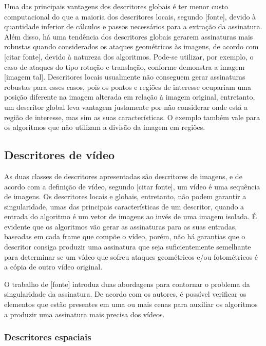 Uma das principais vantagens dos descritores globais é ter menor custo computacional do que a maioria dos descritores locais, segundo [fonte], devido à quantidade inferior de cálculos e passos necessários para a extração da assinatura. Além disso, há uma tendência dos descritores globais gerarem assinaturas mais robustas quando considerados os ataques geométricos às imagens, de acordo com [citar fonte], devido à natureza dos algoritmos. Pode-se utilizar, por exemplo, o caso de ataques do tipo rotação e translação, conforme demonstra a imagem [imagem tal]. Descritores locais usualmente não conseguem gerar assinaturas robustas para esses casos, pois os pontos e regiões de interesse ocupariam uma posição diferente na imagem alterada em relação à imagem original, entretanto, um descritor global leva vantagem justamente por não considerar onde está a região de interesse, mas sim as suas características. O exemplo também vale para os algoritmos que não utilizam a divisão da imagem em regiões.

\subsection{Descritores de vídeo}
\label{descritores de vídeo}

As duas classes de descritores apresentadas são descritores de imagens, e de acordo com a definição de vídeo, segundo [citar fonte], um vídeo é uma sequência de imagens. Os descritores locais e globais, entretanto, não podem garantir a singularidade, umas das principais características de um descritor,  quando a entrada do algoritmo é um vetor de imagens ao invés de uma imagem isolada. É evidente que os algoritmos vão gerar as assinaturas para as suas entradas, baseadas em cada frame que compõe o vídeo, porém, não há garantias que o descritor consiga produzir uma assinatura que seja suficientemente semelhante para determinar se um vídeo que sofreu ataques geométricos e/ou fotométricos é a cópia de outro vídeo original.

O trabalho de [fonte] introduz duas abordagens para contornar o problema da singularidade da assinatura. De acordo com os autores, é possível verificar os elementos que estão presentes em uma ou mais cenas para auxiliar os algoritmos a produzir uma assinatura mais precisa dos vídeos.

\subsubsection{Descritores espaciais}
\label{descritores espaciais}

